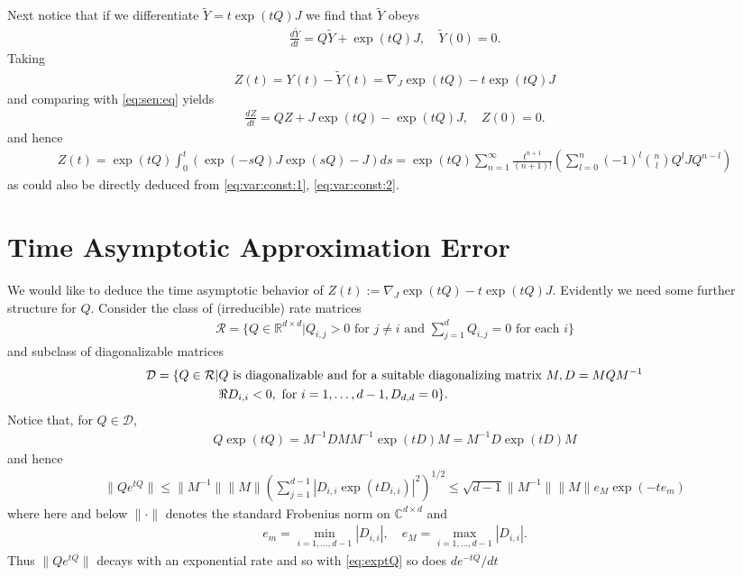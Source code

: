 \documentclass[twoside]{article}
\numberwithin{equation}{section}
\newcommand{\RR}{\mathbb{R}}
\newcommand{\CC}{\mathbb{C}}
\begin{document}
Next notice that if we differentiate $\tilde{Y} =  t  \exp(t Q) J$ we find that $\tilde{Y}$ obeys
\begin{align}
	\frac{d \tilde{Y}}{dt} = Q \tilde{Y} +  \exp(t Q) J, \quad \tilde{Y}(0) = 0.
\end{align}
Taking 
\begin{align}
Z(t) = Y(t) - \tilde{Y}(t) = \nabla_J \exp(t Q) - t  \exp(t Q) J
\label{eq:true:diff}
\end{align}
and comparing with \eqref{eq:sen:eq} yields
\begin{align}
\label{eq:Z:dym}
	\frac{dZ}{dt} = Q Z + J \exp(t Q) -  \exp(t Q) J, \quad Z(0) = 0.
\end{align}
and hence
\begin{align}
	\label{eq:ass:procs}
	Z(t) = \exp(t Q) \int_0^t (\exp(-sQ) J \exp(s Q) - J) ds
	=  \exp(t Q) \sum_{n = 1}^\infty \frac{t^{n+1}}{(n+1)!}  
	\left( \sum_{l = 0}^n (-1)^l \binom{n}{l} Q^l J Q^{n -l}\right)
\end{align}
as could also be directly deduced from \eqref{eq:var:const:1}, \eqref{eq:var:const:2}.


\section{Time Asymptotic Approximation Error}

We would like to deduce the time asymptotic behavior of $Z(t) := \nabla_J \exp(t Q) - t  \exp(t Q) J$.    Evidently we need some further
structure for $Q$.   Consider the class of (irreducible) rate matrices 
\begin{align}
	\mathcal{R} = \{ Q \in \RR^{d\times d} | Q_{i,j} > 0 \text{ for } j \not= i \text{ and } \sum_{j =1}^d Q_{i,j} = 0
	\text{ for each } i\}
\end{align}
and subclass of diagonalizable matrices 
\begin{align}
	\mathcal{D}  =  \{ Q \in \mathcal{R} |& Q \text{ is diagonalizable and for a suitable diagonalizing matrix } M, D = M Q M^{-1} \notag\\
		& \Re D_{i,i} < 0, \text{ for } i = 1, \ldots, d-1, D_{d,d} = 0\}.
		\label{eq:Q:spc}
\end{align}
Notice that, for $Q \in \mathcal{D}$, 
\begin{align*}
Q \exp(t Q) = M^{-1} D M M^{-1} \exp(t D) M = M^{-1} D \exp(t D) M
\end{align*}
 and hence
\begin{align}
	\| Q e^{tQ} \| \leq  \| M^{-1}\| \|M\| \left( \sum_{j =1}^{d-1} | D_{i,i} \exp( t D_{i,i}) |^2 \right)^{1/2}
	\leq  \sqrt{d-1}\| M^{-1}\| \|M\| e_M \exp(-t e_m)
	\label{eq:decay:est:1}
\end{align}
where here and below $\| \cdot \|$ denotes the standard Frobenius norm on $\CC^{d \times d}$
and 
\begin{align}
	e_m = \min_{i = 1, \ldots, d-1} |D_{i,i}|, \quad e_M = \max_{i = 1, \ldots, d-1} |D_{i,i}|.
	\label{eq:max:min:D}
\end{align}
Thus $\| Q e^{tQ} \|$ decays with an exponential rate and so with \eqref{eq:exptQ} so does
$de^{-tQ} /dt$
\end{document}
